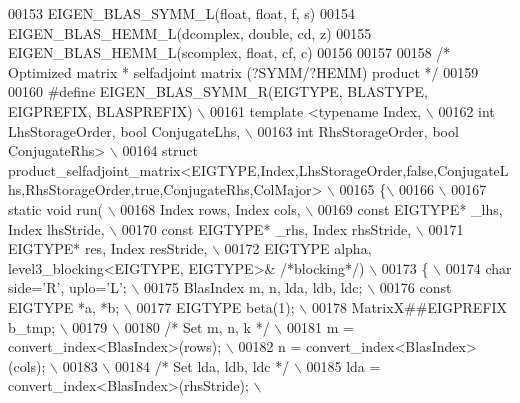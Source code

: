 \begin{DoxyCode}
00153 EIGEN\_BLAS\_SYMM\_L(\textcolor{keywordtype}{float}, \textcolor{keywordtype}{float}, f, s)
00154 EIGEN\_BLAS\_HEMM\_L(dcomplex, \textcolor{keywordtype}{double}, cd, z)
00155 EIGEN\_BLAS\_HEMM\_L(scomplex, \textcolor{keywordtype}{float}, cf, c)
00156 
00157 
00158 \textcolor{comment}{/* Optimized matrix * selfadjoint matrix (?SYMM/?HEMM) product */}
00159 
00160 \textcolor{preprocessor}{#define EIGEN\_BLAS\_SYMM\_R(EIGTYPE, BLASTYPE, EIGPREFIX, BLASPREFIX) \(\backslash\)}
00161 \textcolor{preprocessor}{template <typename Index, \(\backslash\)}
00162 \textcolor{preprocessor}{          int LhsStorageOrder, bool ConjugateLhs, \(\backslash\)}
00163 \textcolor{preprocessor}{          int RhsStorageOrder, bool ConjugateRhs> \(\backslash\)}
00164 \textcolor{preprocessor}{struct
       product\_selfadjoint\_matrix<EIGTYPE,Index,LhsStorageOrder,false,ConjugateLhs,RhsStorageOrder,true,ConjugateRhs,ColMajor> \(\backslash\)}
00165 \textcolor{preprocessor}{\{\(\backslash\)}
00166 \textcolor{preprocessor}{\(\backslash\)}
00167 \textcolor{preprocessor}{  static void run( \(\backslash\)}
00168 \textcolor{preprocessor}{    Index rows, Index cols, \(\backslash\)}
00169 \textcolor{preprocessor}{    const EIGTYPE* \_lhs, Index lhsStride, \(\backslash\)}
00170 \textcolor{preprocessor}{    const EIGTYPE* \_rhs, Index rhsStride, \(\backslash\)}
00171 \textcolor{preprocessor}{    EIGTYPE* res,        Index resStride, \(\backslash\)}
00172 \textcolor{preprocessor}{    EIGTYPE alpha, level3\_blocking<EIGTYPE, EIGTYPE>& }\textcolor{comment}{/*blocking*/}\textcolor{preprocessor}{) \(\backslash\)}
00173 \textcolor{preprocessor}{  \{ \(\backslash\)}
00174 \textcolor{preprocessor}{    char side='R', uplo='L'; \(\backslash\)}
00175 \textcolor{preprocessor}{    BlasIndex m, n, lda, ldb, ldc; \(\backslash\)}
00176 \textcolor{preprocessor}{    const EIGTYPE *a, *b; \(\backslash\)}
00177 \textcolor{preprocessor}{    EIGTYPE beta(1); \(\backslash\)}
00178 \textcolor{preprocessor}{    MatrixX##EIGPREFIX b\_tmp; \(\backslash\)}
00179 \textcolor{preprocessor}{\(\backslash\)}
00180 \textcolor{preprocessor}{}\textcolor{comment}{/* Set m, n, k */}\textcolor{preprocessor}{ \(\backslash\)}
00181 \textcolor{preprocessor}{    m = convert\_index<BlasIndex>(rows);  \(\backslash\)}
00182 \textcolor{preprocessor}{    n = convert\_index<BlasIndex>(cols);  \(\backslash\)}
00183 \textcolor{preprocessor}{\(\backslash\)}
00184 \textcolor{preprocessor}{}\textcolor{comment}{/* Set lda, ldb, ldc */}\textcolor{preprocessor}{ \(\backslash\)}
00185 \textcolor{preprocessor}{    lda = convert\_index<BlasIndex>(rhsStride); \(\backslash\)}

\end{DoxyCode}
